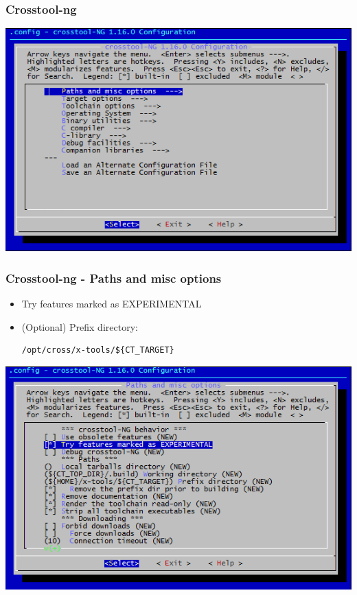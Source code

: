 \documentclass{beamer}
\begin{document}
\begin{frame}
\frametitle{Crosstool-ng}
\begin{center}
\includegraphics[scale=.5]{image/crosstool-ng.png} 
\end{center}
\end{frame}

\begin{frame}[fragile]
\frametitle{Crosstool-ng - Paths and misc options}
\begin{itemize}
\item Try features marked as EXPERIMENTAL
\item (Optional) Prefix directory: \begin{verbatim}
/opt/cross/x-tools/${CT_TARGET}
\end{verbatim}
\end{itemize}
\begin{center}
\includegraphics[scale=.4]{image/crosstool-ng-paths.png} 
\end{center}
\end{frame}
\end{document}
